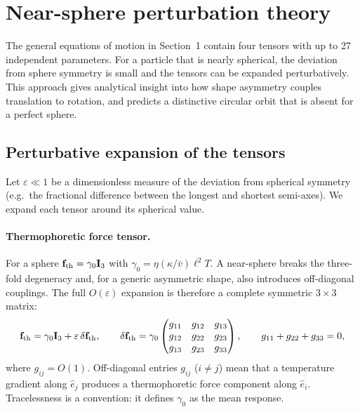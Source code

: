 \documentclass[11pt]{article}
\newcommand{\chg}[1]{\marginpar{\raggedright\footnotesize\textcolor{red!70!black}{\textsf{#1}}}}
\begin{document}
\section{Near-sphere perturbation theory}
The general equations of motion in Section~1 contain four tensors with up to 27 independent parameters.\chg{C9} For a particle that is nearly spherical, the deviation from sphere symmetry is small and the tensors can be expanded perturbatively. This approach gives analytical insight into how shape asymmetry couples translation to rotation, and predicts a distinctive circular orbit that is absent for a perfect sphere.

\subsection{Perturbative expansion of the tensors}
Let $\varepsilon\ll1$ be a dimensionless measure of the deviation from spherical symmetry (e.g.\ the fractional difference between the longest and shortest semi-axes). We expand each tensor around its spherical value.

\paragraph{Thermophoretic force tensor.} For a sphere $\mathbf f_{\rm th}=\gamma_0\mathbf I_3$ with $\gamma_0=\eta(\kappa/\bar v)\ell^2T$.\chg{C8} A near-sphere breaks the three-fold degeneracy and, for a generic asymmetric shape, also introduces off-diagonal couplings. The full $O(\varepsilon)$ expansion is therefore a complete symmetric $3\times3$ matrix:
\begin{equation}
  \mathbf f_{\rm th}=\gamma_0\mathbf I_3+\varepsilon\,\delta\mathbf f_{\rm th},\qquad
  \delta\mathbf f_{\rm th}=\gamma_0\begin{pmatrix}g_{11} & g_{12} & g_{13}\\ g_{12} & g_{22} & g_{23}\\ g_{13} & g_{23} & g_{33}\end{pmatrix},\qquad g_{11}+g_{22}+g_{33}=0,
\end{equation}
where $g_{ij}=O(1)$. Off-diagonal entries $g_{ij}$ ($i\neq j$) mean that a temperature gradient along $\hat e_j$ produces a thermophoretic force component along $\hat e_i$. Tracelessness is a convention: it defines $\gamma_0$ as the mean response.
\end{document}
